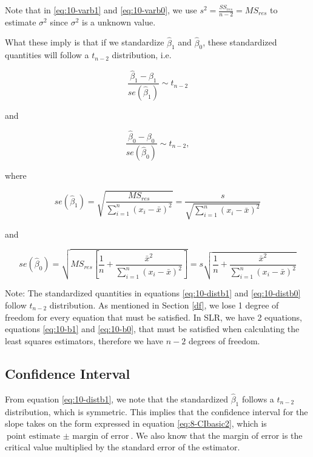 \documentclass[
]{book}
\begin{document}
Note that in \eqref{eq:10-varb1} and \eqref{eq:10-varb0}, we use \(s^2 = \frac{SS_{res}}{n-2} = MS_{res}\) to estimate \(\sigma^2\) since \(\sigma^2\) is a unknown value.

What these imply is that if we standardize \(\hat{\beta}_1\) and \(\hat{\beta}_0\), these standardized quantities will follow a \(t_{n-2}\) distribution, i.e.

\begin{equation} 
\frac{\hat{\beta}_1 - \beta_1}{se(\hat{\beta}_1)}\sim t_{n-2}
\label{eq:10-distb1}
\end{equation}

and

\begin{equation} 
\frac{\hat{\beta}_0 - \beta_0}{se(\hat{\beta}_0)}\sim t_{n-2},
\label{eq:10-distb0}
\end{equation}

where

\begin{equation}
se(\hat{\beta}_1) = \sqrt{\frac{MS_{res}}{\sum_{i=1}^n{(x_{i}-\bar{x})^{2}}}} = \frac{s}{\sqrt{\sum_{i=1}^n{(x_{i}-\bar{x})^{2}}}}
\label{eq:10-seb1}
\end{equation}

and

\begin{equation} 
se(\hat{\beta}_0) = \sqrt{MS_{res}\left[\frac{1}{n} + \frac{\bar{x}^2}{\sum_{i=1}^n (x_i -\bar{x})^2}\right]} = s \sqrt{\frac{1}{n} + \frac{\bar{x}^2}{\sum_{i=1}^n (x_i -\bar{x})^2}}
\label{eq:10-seb0}
\end{equation}

Note: The standardized quantities in equations \eqref{eq:10-distb1} and \eqref{eq:10-distb0} follow \(t_{n-2}\) distribution. As mentioned in Section \ref{df}, we lose 1 degree of freedom for every equation that must be satisfied. In SLR, we have 2 equations, equations \eqref{eq:10-b1} and \eqref{eq:10-b0}, that must be satisfied when calculating the least squares estimators, therefore we have \(n-2\) degrees of freedom.

\subsection{Confidence Interval}\label{confidence-interval}

From equation \eqref{eq:10-distb1}, we note that the standardized \(\hat{\beta}_1\) follows a \(t_{n-2}\) distribution, which is symmetric. This implies that the confidence interval for the slope takes on the form expressed in equation \eqref{eq:8-CIbasic2}, which is \(\text{point estimate } \pm \text{ margin of error}\). We also know that the margin of error is the critical value multiplied by the standard error of the estimator.
\end{document}
